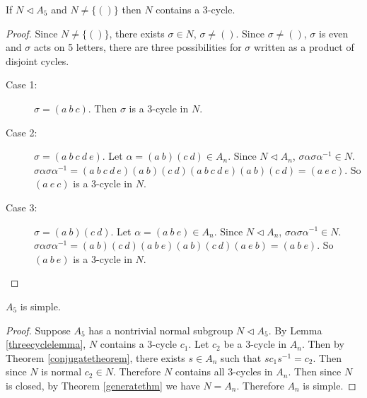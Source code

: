 \documentclass[a4paper]{article}
\begin{document}
\begin{lemma}
\label{threecyclelemma}
If $N \triangleleft A_5$ and $N \ne \{()\}$ then $N$ contains a 3-cycle.
\end{lemma}
\begin{proof}
Since $N \ne \{()\}$, there exists $\sigma \in N$, $\sigma \ne ()$. Since $\sigma \ne ()$, $\sigma$ is even and $\sigma$ acts on 5 letters, there are three possibilities for $\sigma$ written as a product of disjoint cycles.
\begin{description}
    \item[Case 1:]
    $\sigma = (a\ b\ c)$. Then $\sigma$ is a 3-cycle in $N$.
    \item[Case 2:]
    $\sigma = (a\ b\ c\ d\ e)$. Let $\alpha = (a\ b)(c\ d) \in A_n$. Since $N \triangleleft A_n$, $\sigma \alpha \sigma \alpha^{-1} \in N$. $\sigma \alpha \sigma \alpha^{-1} = (a\ b\ c\ d\ e)(a\ b)(c\ d)(a\ b\ c\ d\ e)(a\ b)(c\ d) = (a\ e\ c)$. So $(a\ e\ c)$ is a 3-cycle in $N$.
    \item[Case 3:]
    $\sigma = (a\ b)(c\ d)$. Let $\alpha = (a\ b\ e) \in A_n$. Since $N \triangleleft A_n$, $\sigma \alpha \sigma \alpha^{-1} \in N$. $\sigma \alpha \sigma \alpha^{-1} = (a\ b)(c\ d)(a\ b\ e)(a\ b)(c\ d)(a\ e\ b) = (a\ b\ e)$. So $(a\ b\ e)$ is a 3-cycle in $N$.
\end{description}
\end{proof}

\begin{theorem}
\label{a5theorem}
$A_5$ is simple.
\end{theorem}
\begin{proof}
Suppose $A_5$ has a nontrivial normal subgroup $N \triangleleft A_5$. By Lemma \ref{threecyclelemma}, $N$ contains a 3-cycle $c_1$. Let $c_2$ be a 3-cycle in $A_n$. Then by Theorem \ref{conjugatetheorem}, there exists $s \in A_n$ such that $s c_1 s^{-1} = c_2$. Then since $N$ is normal $c_2 \in N$. Therefore $N$ contains all 3-cycles in $A_n$. Then since $N$ is closed, by Theorem \ref{generatethm} we have $N = A_n$. Therefore $A_n$ is simple.
\end{proof}
\end{document}
